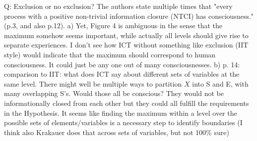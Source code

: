 \documentclass[utf8]{article}
\newcounter{cQuestion}[section]
\newenvironment{question}
    {\refstepcounter{cQuestion}\color{Blue}\noindent\newline Q\thecQuestion:}
    {~\newline}
\begin{document}
        \begin{question}
            Exclusion or no exclusion? The authors state multiple times that "every process with a positive non-trivial information closure (NTCI) has consciousness." (p.3, and also p.12).
            a) Yet, Figure 4 is ambiguous in the sense that the maximum somehow seems important, while actually all levels should give rise to separate experiences. I don't see how ICT without something like exclusion (IIT style) would indicate that the maximum should correspond to human consciousness. It could just be any one out of many consciousnesses.
            b) p. 14: comparison to IIT: what does ICT say about different sets of variables at the same level. There might well be multiple ways to partition $X$ into S and E, with many overlapping S's. Would those all be conscious? They would not be informationally closed from each other but they could all fulfill the requirements in the Hypothesis. It seems like finding the maximum within a level over the possible sets of elements/variables is a necessary step to identify boundaries (I think also Krakauer does that across sets of variables, but not 100\% sure)        
        \end{question}
    
\end{document}
